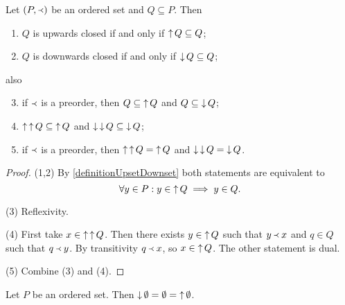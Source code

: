 \begin{lemma} \label{QsubseteqDownQ} \label{upwardDownwardClosure}
Let $\left( P, \Yleft \right)$ be an ordered set and $Q\subseteq P$. Then
\begin{enumerate}
\item $Q$ is upwards closed \textup{if and only if} $\mathop{\uparrow} Q \subseteq Q$;
\item $Q$ is downwards closed \textup{if and only if} $\mathop{\downarrow} Q \subseteq Q$;
\end{enumerate}
also
\begin{enumerate} \setcounter{enumi}{2}
\item if $\Yleft$ is a preorder, then $Q \subseteq \mathop{\uparrow} Q$ and $Q \subseteq \mathop{\downarrow} Q$;
\item $\mathop{\uparrow}\mathop{\uparrow} Q \subseteq \mathop{\uparrow} Q$ and $\mathop{\downarrow}\mathop{\downarrow} Q \subseteq \mathop{\downarrow} Q$;
\item if $\Yleft$ is a preorder, then $\mathop{\uparrow}\mathop{\uparrow} Q = \mathop{\uparrow} Q$ and $\mathop{\downarrow}\mathop{\downarrow} Q = \mathop{\downarrow} Q$.
\end{enumerate}
\end{lemma}
\begin{proof}
(1,2) By \ref{definitionUpsetDownset} both statements are equivalent to
\[ \forall y\in P: y\in \mathop{\uparrow} Q \implies y\in Q. \]

(3) Reflexivity.

(4) First take $x\in \mathop{\uparrow}\mathop{\uparrow} Q$. Then there exists $y\in \mathop{\uparrow} Q$ such that $y\Yleft x$ and $q\in Q$ such that $q\Yleft y$. By transitivity $q \Yleft x$, so $x\in \mathop{\uparrow} Q$. The other statement is dual.

(5) Combine (3) and (4).
\end{proof}

\begin{lemma}
Let $P$ be an ordered set. Then $\mathop{\downarrow}\emptyset = \emptyset = \mathop{\uparrow}\emptyset$.
\end{lemma}

